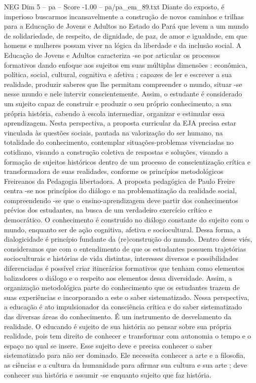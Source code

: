 \begin{textsample}{NEG Dim 5 – pa – Score -1.00 – pa/pa\_em\_89.txt}
Diante do exposto, é imperioso buscarmos incansavelmente a construção de novos caminhos e trilhas para a Educação de Jovens e Adultos no Estado do Pará que levem a um mundo de solidariedade, de respeito, de dignidade, de paz, de amor e igualdade, em que homens e mulheres possam viver na lógica da liberdade e da inclusão social.
A Educação de Jovens e Adultos caracteriza -se por articular os processos formativos dando enfoque aos sujeitos em suas múltiplas dimensões : econômica, política, social, cultural, cognitiva e afetiva ; capazes de ler e escrever a sua realidade, produzir saberes que lhe permitam compreender o mundo, situar -se nesse mundo e nele intervir conscientemente.
Assim, o estudante é considerado um sujeito capaz de construir e produzir o seu próprio conhecimento, a sua própria história, cabendo à escola intermediar, organizar e estimular essa aprendizagem.
Nesta perspectiva, a proposta curricular da EJA precisa estar vinculada às questões sociais, pautada na valorização do ser humano, na totalidade do conhecimento, contemplar situações-problemas vivenciadas no cotidiano, visando a construção coletiva de respostas e soluções, visando a formação de sujeitos históricos dentro de um processo de conscientização crítica e transformadora de suas realidades, conforme os princípios metodológicos Freireanos da Pedagogia libertadora.
A proposta pedagógica de Paulo Freire centra -se nos princípios do diálogo e na problematização da realidade social, compreendendo -se que o ensino-aprendizagem deve partir dos conhecimentos prévios dos estudantes, na busca de um verdadeiro exercício crítico e democrático.
O conhecimento é construído no diálogo constante do sujeito com o mundo, enquanto ser de ação cognitiva, afetiva e sociocultural.
Dessa forma, a dialogicidade é princípio fundante da (re)construção do mundo.
Dentro desse viés, consideramos que com o entendimento de que os estudantes possuem trajetórias socioculturais e histórias de vida distintas, interesses diversos e possibilidades diferenciadas é possível criar itinerários formativos que tenham como elementos balizadores o diálogo e o respeito aos elementos dessa diversidade.
Assim, a organização metodológica parte do conhecimento que os estudantes trazem de suas experiências e incorporando a este o saber sistematizado.
Nessa perspectiva, a educação é ato impulsionador da consciência crítica e do saber sistematizado das diversas áreas do conhecimento.
É um instrumento de desvelamento da realidade.
O educando é sujeito de sua história ao pensar sobre sua própria realidade, pois tem direito de conhecer e transformar com autonomia o tempo e o espaço no qual se insere.
Esse sujeito deve e precisa conhecer o saber sistematizado para não ser dominado.
Ele necessita conhecer a arte e a filosofia, as ciências e a cultura da humanidade para afirmar sua cultura e sua arte ; deve conhecer sua história e assumir -se enquanto sujeito que faz história.

\end{textsample}
